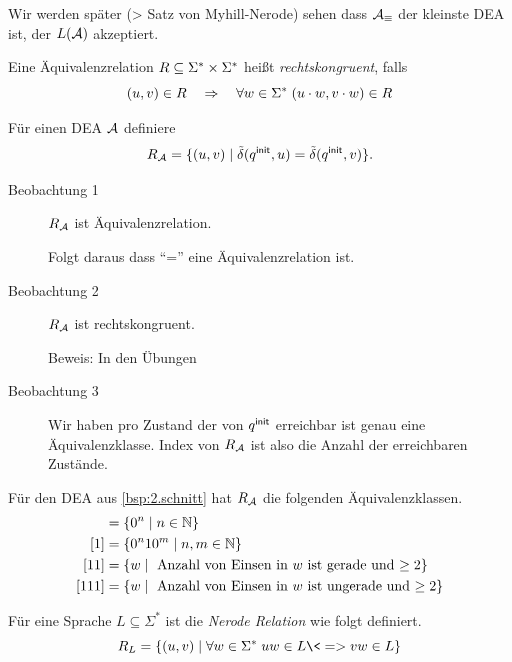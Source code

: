 Wir werden später (\-> Satz von Myhill-Nerode) sehen dass $\mathcal{A}_\equiv$ der kleinste DEA ist, der $L(\mathcal{A})$ akzeptiert.

\begin{Def}[name={[Rechtskongruente Äquivalenzrelation]}]
        Eine Äquivalenzrelation $R\subseteq\Sigma^*\times\Sigma^*$ heißt \emph{rechtskongruent}, falls
        \[ (u,v)\in R \quad\=>\quad \forall w\in\Sigma^*\;(u\cdot w,v\cdot w) \in R \]
\end{Def}
\begin{Bsp} %
  \label{Bsp:R_m}
        Für einen \ac{DEA} $\mathcal{A}$ definiere
        \[ R_{\mathcal{A}} = \{(u,v) \mid \tilde\delta({q^\mathsf{init}},u)=\tilde\delta({q^\mathsf{init}},v)\}. \]
        \begin{description}
                \item[Beobachtung 1] $R_{\mathcal{A}}$ ist Äquivalenzrelation.
                
                Folgt daraus dass ``='' eine Äquivalenzrelation ist.
                \item[Beobachtung 2] $R_{\mathcal{A}}$ ist rechtskongruent. 
                
                Beweis: In den Übungen
                \item[Beobachtung 3] Wir haben pro Zustand der von ${q^\mathsf{init}}$ erreichbar ist genau eine Äquivalenzklasse.
                Index von $R_{\mathcal{A}}$ ist also die Anzahl der erreichbaren Zustände.
        \end{description}
        
        \medskip
        
        Für den \ac{DEA} aus \autoref{bsp:2.schnitt} hat $R_{\mathcal{A}}$ die folgenden Äquivalenzklassen.
        \begin{align*}
        [\Eps] &= \{0^n\mid n\in \N\}\\
        [1] &= \{0^n10^m\mid n,m\in \N\}\\
        [11] &= \{w\mid \text{ Anzahl von Einsen in $w$ ist gerade und $\geq 2$}\}\\
        [111] &= \{w\mid \text{ Anzahl von Einsen in $w$ ist ungerade und $\geq 2$}\}\\
        \end{align*}
\end{Bsp}
\begin{Def}
        Für eine Sprache $L\subseteq \Sigma^*$ ist die \emph{Nerode Relation} wie folgt definiert.
        \[ R_L = \{(u,v) \mid \forall w\in\Sigma^*\; uw\in L \<=> vw\in L \} \]
\end{Def}
